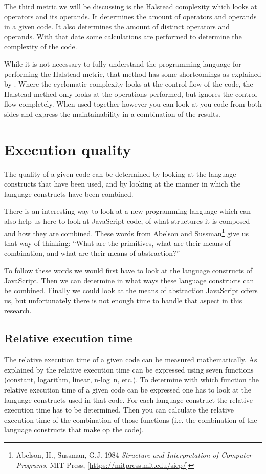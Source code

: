 \documentclass{article}
\begin{document}
The third metric we will be discussing is the Halstead complexity which looks
at operators and its operands. It determines the amount of operators and
operands in a given code. It also determines the amount of distinct operators
and operands. With that date some calculations are performed to determine the
complexity of the code.

While it is not necessary to fully understand the programming language for
performing the Halstead metric, that method has some shortcomings as explained
by \citet{yu2010survey}. Where the cyclomatic complexity looks at the control
flow of the code, the Halstead methed only looks at the operations performed,
but ignores the control flow completely. When used together however you can look at you code from both sides and express the maintainability in a combination of the results.

\section{Execution quality}

The quality of a given code can be determined by looking at the language constructs
that have been used, and by looking at the manner in which the language constructs
have been combined.

There is an interesting way to look at a new programming language which can
also help us here to look at JavaScript code, of what structures it is composed
and how they are combined. These words from Abelson and
Sussman\footnote{Abelson, H., Sussman, G.J. 1984 {\em Structure and
Interpretation of Computer Programs}. MIT Press,
[\url{https://mitpress.mit.edu/sicp/}]} give us that way of thinking: ``What
are the primitives, what are their means of combination, and what are their
means of abstraction?''

To follow these words we would first have to look at the language constructs of
JavaScript. Then we can determine in what ways these language constructs can be
combined. Finally we could look at the means of abstraction JavaScript offers
us, but unfortunately there is not enough time to handle that aspect in this
research.

\subsection{Relative execution time}

The relative execution time of a given code can be measured mathematically. As
explained by \citet[Chapter 4]{goodrich2008data} the relative execution time
can be expressed using seven functions (constant, logarithm, linear, n-log~n,
etc.). To determine with which function the relative execution time of a given
code can be expressed one has to look at the language constructs used in that
code. For each language construct the relative execution time has to be
determined. Then you can calculate the relative execution time of the
combination of those functions (i.e. the combination of the language constructs
that make op the code).
\end{document}
